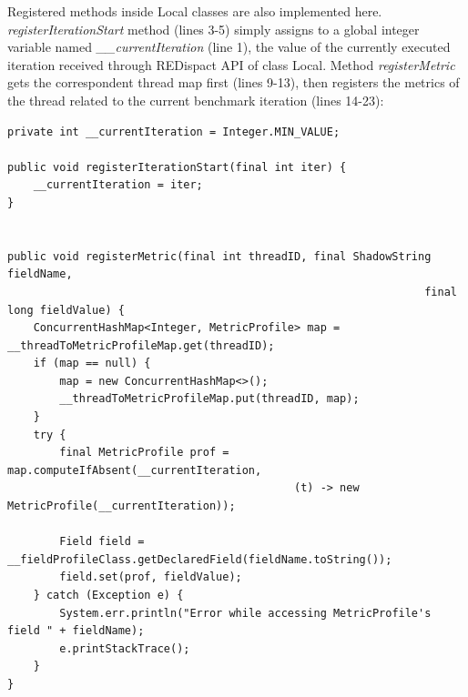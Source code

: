\documentclass[]{usiinfthesis}
\begin{document}
    \newline    \newline
    Registered methods inside Local classes are also implemented here. \textit{registerIterationStart} method (lines 3-5) simply assigns to a global integer variable named \textit{\_\_currentIteration} (line 1), the value of the currently executed iteration received through REDispact API of class Local. Method \textit{registerMetric} gets the correspondent thread map first (lines 9-13), then registers the metrics of the thread related to the current benchmark iteration (lines 14-23):
    
    \vspace*{0.25cm}
        \begin{verbatim}
private int __currentIteration = Integer.MIN_VALUE;

public void registerIterationStart(final int iter) {
    __currentIteration = iter;
}


public void registerMetric(final int threadID, final ShadowString fieldName,
                                                                final long fieldValue) {
    ConcurrentHashMap<Integer, MetricProfile> map = __threadToMetricProfileMap.get(threadID);
    if (map == null) {
        map = new ConcurrentHashMap<>();
        __threadToMetricProfileMap.put(threadID, map);
    }
    try {
        final MetricProfile prof = map.computeIfAbsent(__currentIteration, 
                                            (t) -> new MetricProfile(__currentIteration));

        Field field = __fieldProfileClass.getDeclaredField(fieldName.toString());
        field.set(prof, fieldValue);
    } catch (Exception e) {
        System.err.println("Error while accessing MetricProfile's field " + fieldName);
        e.printStackTrace();
    }
}
    \end{verbatim}
    \vspace*{0.25cm}
    
\end{document}
